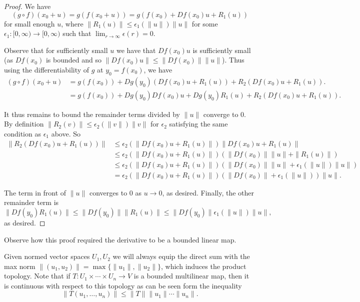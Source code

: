 \documentclass[twoside, a4paper, 10pt]{amsart}
\begin{document}
\begin{proof} We have $$(g \circ f)(x_0 + u) = g(f(x_0 +u)) = g(f(x_0) + Df(x_0)u + R_1(u))$$ for small enough $u$, where $\|R_1(u)\| \leq \epsilon_1(\|u\|)\|u\|$ for some $\epsilon_1:[0,\infty) \to [0,\infty)$ such that $\lim_{r \to \infty} \epsilon(r) = 0$.

Observe that for sufficiently small $u$ we have that $Df(x_0)u$ is sufficiently small (as $Df(x_0)$ is bounded and so $\|Df(x_0) u \| \leq \|Df(x_0)\| \|u\|$). Thus using the differentiability of $g$ at $y_0 = f(x_0)$, we have
\begin{align*}(g \circ f)(x_0+u) &= g(f(x_0)) + Dg(y_0)(Df(x_0)u + R_1(u)) + R_2(Df(x_0)u + R_1(u)). \\
&= g(f(x_0)) + Dg(y_0)Df(x_0)u  + Dg(y_0)R_1(u) + R_2(Df(x_0)u + R_1(u)).  \end{align*}

It thus remains to bound the remainder terms divided by $\|u\|$ converge to $0$. By definition $\|R_2(v)\| \leq \epsilon_2(\|v\|) \|v\|$ for $\epsilon_2$ satisfying the same condition as $\epsilon_1$ above. So
\begin{align*}\|R_2(Df(x_0)u + R_1(u))\| &\leq \epsilon_2(\|Df(x_0)u + R_1(u)\|) \|Df(x_0)u + R_1(u)\|  \\
& \leq  \epsilon_2(\|Df(x_0)u + R_1(u) \|) \left(\|Df(x_0)\| \|u\| + \|R_1(u)\| \right) \\
& \leq \epsilon_2(\|Df(x_0)u + R_1(u)\|) \left(\|Df(x_0)\| \|u\| + \epsilon_1(\|u\|)\|u\| \right) \\
& = \epsilon_2(\|Df(x_0)u + R_1(u)\|) \left(\|Df(x_0)\| + \epsilon_1(\|u\|) \right) \|u\|. 
\end{align*}

The term in front of $\|u\|$ converges to $0$ as $u \to 0$, as desired. Finally, the other remainder term is $$\| Df(y_0)R_1(u) \| \leq \|Df(y_0)\| \|R_1(u)\| \leq \|Df(y_0)\|\epsilon_1(\|u\|) \|u\|,$$
as desired.  \end{proof}

\begin{remark} Observe how this proof required the derivative to be a bounded linear map. \end{remark}

Given normed vector spaces $U_1, U_2$ we will always equip the direct sum with the max norm $\|(u_1, u_2)\| = \max \{\|u_1\|, \|u_2 \| \}$, which induces the product topology. Note that if $T:U_1 \times \cdots \times U_n \to V$ is a bounded multilinear map, then it is continuous with respect to this topology as can be seen form the inequality $$\|T(u_1, \ldots, u_n)\| \leq \|T\|\|u_1\| \cdots \|u_n\|.$$
\end{document}

